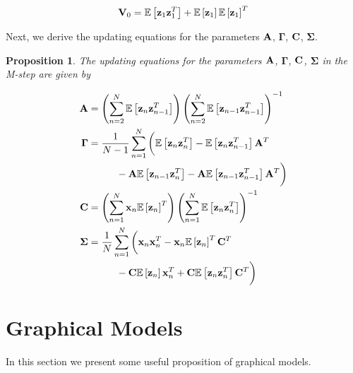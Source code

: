 \documentclass[11pt]{article}
\newcommand{\expectation}[1]{\mathbb{E}\left[#1\right]}
\newtheorem{proposition}{Proposition}[section]
\begin{document}
\begin{equation}
	{\bf V}_0 = \expectation{{\bf z}_1 {\bf z}_1^T} + \expectation{{\bf z}_1}\expectation{{\bf z}_1}^T
\end{equation}

Next, we derive the updating equations for the parameters $\bf A$, $\boldsymbol{\Gamma}$, $\bf C$, $\boldsymbol{\Sigma}$.

\begin{proposition}
	The updating equations for the parameters $\bf A$, $\boldsymbol{\Gamma}$, $\bf C$, $\boldsymbol{\Sigma}$ in the M-step are given by
	
	\begin{align}
		{\bf A} &= \left(\sum_{n=2}^N \expectation{{\bf z}_n {\bf z}_{n-1}^T}\right)\left(\sum_{n=2}^N \expectation{{\bf z}_{n-1}{\bf z}_{n-1}^T}\right)^{-1} \\
		\boldsymbol{\Gamma} &= \frac{1}{N-1}\sum_{n=1}^N\bigg( \expectation{{\bf z}_n {\bf z}_n^T} - \expectation{{\bf z}_n {\bf z}_{n-1}^T}{\bf A}^T \nonumber\\
		&\hspace{1cm} - {\bf A}\expectation{{\bf z}_{n-1}{\bf z}_n^T} - {\bf A}\expectation{{\bf z}_{n-1} {\bf z}_{n-1}^T}{\bf A}^T \bigg) \\
		{\bf C} &= \left(\sum_{n=1}^N {\bf x}_n \expectation{{\bf z}_n}^T \right)\left(\sum_{n=1}^N \expectation{{\bf z}_n {\bf z}_n^T} \right)^{-1} \\
		\boldsymbol{\Sigma} &= \frac{1}{N}\sum_{n=1}^N\bigg({\bf x}_n{\bf x}_n^T - {\bf x}_n \expectation{{\bf z}_n}^T {\bf C}^T \nonumber\\
		&\hspace{1cm} - {\bf C}\expectation{{\bf z}_n}{\bf x}_n^T + {\bf C} \expectation{{\bf z}_n {\bf z}_n^T}{\bf C}^T \bigg)
	\end{align}
\end{proposition}


\section{Graphical Models}
In this section we present some useful proposition of graphical models.
\end{document}
